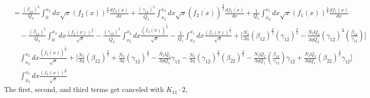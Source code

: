 \documentclass[fleqn, 10pt]{article}
\begin{document}
 \begin{equation*}
 \begin{split}
     &= \frac{(\beta_{12})^3}{Q_2} \int^{x_2}_0 dx \sqrt{x} (f_2(x))^\frac{3}{2} \frac{df_2(x)}{dx} + \frac{(\gamma_{1\overline{2}})^3}{\overline{Q_{2}}} \int^{\overline{x_{2}}}_{x_2} dx \sqrt{x} (\overline{f_{2}(x)})^\frac{3}{2} \frac{d\overline{f_{2}(x)}}{dx} + \frac{1}{Q_1} \int^{x_1}_{\overline{x_{2}}} dx \sqrt{x} (f_1(x))^\frac{3}{2} \frac{df_1(x)}{dx} \\ & \quad - \frac{(\beta_{12})^3}{Q_2} \int^{x_2}_0 dx \frac{(f_2(x))^\frac{5}{2}}{\sqrt{x}} - \frac{(\gamma_{1\overline{2}})^3}{\overline{Q_{2}}} \int^{\overline{x_{2}}}_{x_2} dx \frac{(\overline{f_{2}(x)})^\frac{5}{2}}{\sqrt{x}} - \frac{1}{Q_1} \int^{x_1}_{\overline{x_{2}}} dx \frac{(f_1(x))^\frac{5}{2}}{\sqrt{x}} + \Biggl[ \frac{N_2}{3 \eta} (\beta_{12})^\frac{3}{2} (\gamma_{1\overline{2}})^\frac{3}{2} - \frac{N_2 Q_2}{3 \eta \overline{Q_{2}}} (\gamma_{1\overline{2}})^3 \left( \frac{\beta_{12}}{\gamma_{1\overline{2}}}\right) \Biggr] \\ & \quad \int^{\overline{x_{2}}}_{x_2} dx \frac{(\overline{f_{2}(x)})^\frac{3}{2}}{\sqrt{x}} + \Biggl[ \frac{N_2}{3 \eta} (\beta_{12})^\frac{3}{2} + \frac{\overline{N_{2}}}{3 \eta} (\gamma_{1\overline{2}})^\frac{3}{2} - \frac{\overline{N_{2}} \overline{Q_{2}}}{3 \eta Q_1} \gamma_{1\overline{2}} - \frac{N_2}{3 \eta} (\gamma_{1\overline{2}})^\frac{3}{2} (\beta_{\overline{2}2})^\frac{3}{2} - \frac{N_2 Q_2}{3 \eta Q_1} \left( \frac{\beta_{12}}{\gamma_{1\overline{2}}}\right) \gamma_{1\overline{2}} + \frac{N_2 \overline{Q_{2}}}{3 \eta Q_1} (\beta_{\overline{2}2})^\frac{3}{2} \gamma_{1\overline{2}} \Biggr] \\ & \quad \int^{x_1}_{\overline{x_{2}}} dx \frac{(f_1(x))^\frac{3}{2}}{\sqrt{x}} 
     \end{split}
 \end{equation*}
 The first, second, and third terms get canceled with $K_{11} \cdot 2$,
\end{document}

